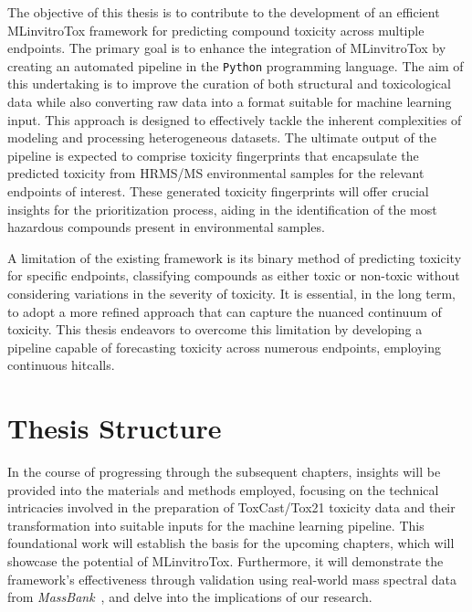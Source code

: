 The objective of this thesis is to contribute to the development of an efficient MLinvitroTox framework for predicting compound toxicity across multiple endpoints. The primary goal is to enhance the integration of MLinvitroTox by creating an automated pipeline in the \texttt{Python} programming language. The aim of this undertaking is to improve the curation of both structural and toxicological data while also converting raw data into a format suitable for machine learning input. This approach is designed to effectively tackle the inherent complexities of modeling and processing heterogeneous datasets. The ultimate output of the pipeline is expected to comprise toxicity fingerprints that encapsulate the predicted toxicity from HRMS/MS environmental samples for the relevant endpoints of interest. These generated toxicity fingerprints will offer crucial insights for the prioritization process, aiding in the identification of the most hazardous compounds present in environmental samples.

A limitation of the existing framework is its binary method of predicting toxicity for specific endpoints, classifying compounds as either toxic or non-toxic without considering variations in the severity of toxicity. It is essential, in the long term, to adopt a more refined approach that can capture the nuanced continuum of toxicity. This thesis endeavors to overcome this limitation by developing a pipeline capable of forecasting toxicity across numerous endpoints, employing continuous hitcalls.



\section{Thesis Structure}

In the course of progressing through the subsequent chapters, insights will be provided into the materials and methods employed, focusing on the technical intricacies involved in the preparation of ToxCast/Tox21 toxicity data and their transformation into suitable inputs for the machine learning pipeline. This foundational work will establish the basis for the upcoming chapters, which will showcase the potential of MLinvitroTox. Furthermore, it will demonstrate the framework's effectiveness through validation using real-world mass spectral data from  \emph{MassBank}~\cite{massbank}, and delve into the implications of our research.
